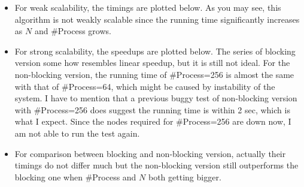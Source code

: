 \documentclass{article}
\begin{document}
\begin{enumerate}
\begin{itemize}
    \item For weak scalability, the timings are plotted below. As you may see,
    this algorithm is not weakly scalable since the running time significantly
    increases as $N$ and \#Process grows.
    \begin{center}  \end{center}

    \item For strong scalability, the speedups are plotted below. The series
    of blocking version some how resembles linear speedup, but it is still not
    ideal. For the non-blocking version, the running time of \#Process=256 is
    almost the same with that of \#Process=64, which might be caused by
    instability of the system. I have to mention that a previous buggy test of
    non-blocking version with \#Process=256 does suggest the running time is
    within 2 sec, which is what I expect. Since the nodes required for
    \#Process=256 are down now, I am not able to run the test again.
    \begin{center}  \end{center}

    \item For comparison between blocking and non-blocking version, actually
    their timings do not differ much but the non-blocking version still
    outperforms the blocking one when \#Process and $N$ both getting bigger.
  \end{itemize}


\end{enumerate}
\end{document}
